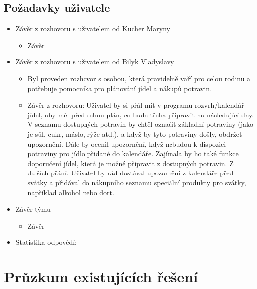 \documentclass[a4paper,12pt]{article}
\begin{document}
\subsection*{Požadavky uživatele}
\begin{itemize}
    \item Závěr z rozhovoru s uživatelem od Kucher Maryny
    \begin{itemize}
        \item Závěr
    \end{itemize}
    \item Závěr z rozhovoru s uživatelem od Bilyk Vladyslavy
    \begin{itemize}
        \item Byl proveden rozhovor s osobou, která pravidelně vaří pro celou rodinu a potřebuje pomocníka pro plánování jídel a nákupů potravin.
        \item Závěr z rozhovoru: Uživatel by si přál mít v programu rozvrh/kalendář jídel, aby měl před sebou plán, co bude třeba připravit na následující dny. V seznamu dostupných potravin by chtěl označit základní potraviny (jako je sůl, cukr, máslo, rýže atd.), a když by tyto potraviny došly, obdržet upozornění. Dále by ocenil upozornění, když nebudou k dispozici potraviny pro jídlo přidané do kalendáře. Zajímala by ho také funkce doporučení jídel, která je možné připravit z dostupných potravin. Z dalších přání: Uživatel by rád dostával upozornění z kalendáře před svátky a přidával do nákupního seznamu speciální produkty pro svátky, například alkohol nebo dort.
    \end{itemize}
    \item Závěr týmu
    \begin{itemize}
        \item Závěr
    \end{itemize}
    \item Statistika odpovědí:
\end{itemize}

\section*{Průzkum existujících řešení}
\end{document}
